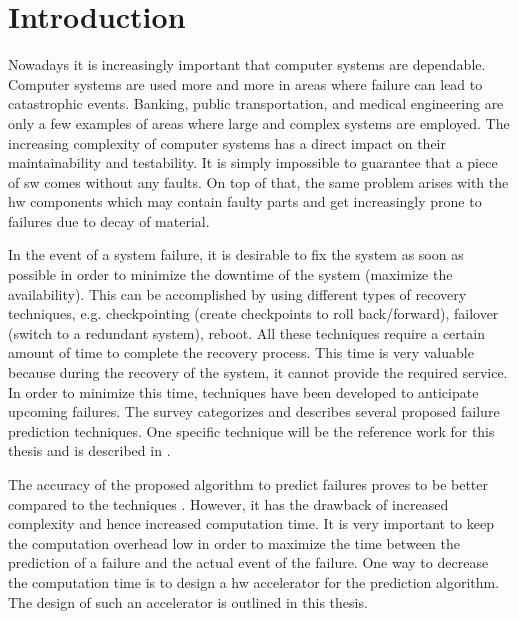 \documentclass[mscthesis]{usiinfthesis}
\begin{document}
\tableofcontents 
\listoffigures %
\listoftables %

\mainmatter

\chapter{Introduction}
\label{ch:intro}
\glsresetall %

Nowadays it is increasingly important that computer systems are dependable.
Computer systems are used more and more in areas where failure can lead to
catastrophic events.  Banking, public transportation, and medical engineering
are only a few examples of areas where large and complex systems are employed.
The increasing complexity of computer systems has a direct impact on their
maintainability and testability. It is simply impossible to guarantee that
a piece of \gls{sw} comes without any faults. On top of that, the same problem
arises with the \gls{hw} components which may contain faulty parts and get
increasingly prone to failures due to decay of material.

In the event of a system failure, it is desirable to fix the system as soon as
possible in order to minimize the downtime of the system (maximize the
availability). This can be accomplished by using different types of recovery
techniques, e.g. checkpointing (create checkpoints to roll back/forward),
failover (switch to a redundant system), reboot. All these techniques require
a certain amount of time to complete the recovery process. This time is very
valuable because during the recovery of the system, it cannot provide the
required service. In order to minimize this time, techniques have been
developed to anticipate upcoming failures. The survey \cite{ACM10_Salfner}
categorizes and describes several proposed failure prediction techniques. One
specific technique will be the reference work for this thesis and is described
in \cite{salfner08}.

The accuracy of the proposed algorithm to predict failures proves to be better
compared to the techniques \cite{lin88, ICDM02_Vilalta, domeniconi02}. However,
it has the drawback of increased complexity and hence increased computation
time. It is very important to keep the computation overhead low in order to
maximize the time between the prediction of a failure and the actual event of
the failure. One way to decrease the computation time is to design a \gls{hw}
accelerator for the prediction algorithm. The design of such an accelerator is
outlined in this thesis.
\end{document}
